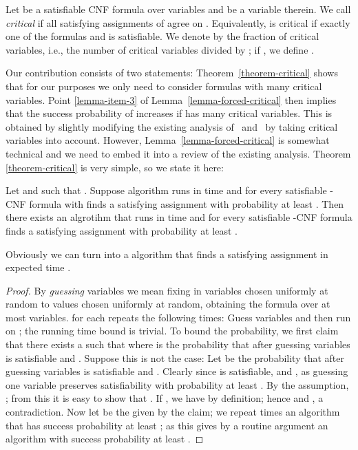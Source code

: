 Let  be a satisfiable CNF formula over  variables and  be a variable therein.
We call  {\em critical} if all satisfying assignments of  agree
on . Equivalently,  is critical if exactly one of the formulas
 and  is satisfiable. We denote by  the fraction of
critical variables, i.e., the number of critical variables divided by
; if , we define .

Our contribution consists of two statements: Theorem~\ref{theorem-critical} shows that for our purposes we only need to consider formulas with many critical variables. Point \ref{lemma-item-3} of Lemma~\ref{lemma-forced-critical} then implies that the success
probability of  increases if  has many critical variables. This is obtained by slightly modifying the existing analysis of~\cite{ppsz} and~\cite{rolf2006} by taking critical variables into account. However, Lemma~\ref{lemma-forced-critical} is somewhat technical and we need to embed it into a review of the existing analysis.
Theorem \ref{theorem-critical} is very simple, so we state it here:
\begin{theorem}
\label{theorem-critical}
Let  and  such that . Suppose algorithm  runs in time  and for every satisfiable -CNF formula  with  finds a satisfying assignment with probability at least . Then there exists an algrotihm  that runs in time  and for every satisfiable -CNF formula finds a satisfying assignment with probability at least .
\end{theorem}
Obviously we can turn  into a algorithm that finds a satisfying assignment in expected time .
\begin{proof}
By \emph{guessing}  variables we mean fixing in   variables chosen uniformly at random to values chosen uniformly at random, obtaining the formula  over at most  variables.  for each  repeats the following  times: Guess  variables and then run  on ; the running time bound is trivial. To bound the probability, we first claim that there exists a  such that  where  is the probability that after guessing  variables  is satisfiable and . Suppose this is not the case: Let  be the probability that after guessing  variables  is satisfiable and . Clearly  since  is satisfiable, and , as guessing one variable preserves satisfiability with probability at least . By the assumption, ; from this it is easy to show that . If , we have  by definition; hence  and , a contradiction. Now let  be the  given by the claim; we repeat  times an algorithm that has success probability at least ; as  this gives by a routine argument an algorithm with success probability at least .
\end{proof}

